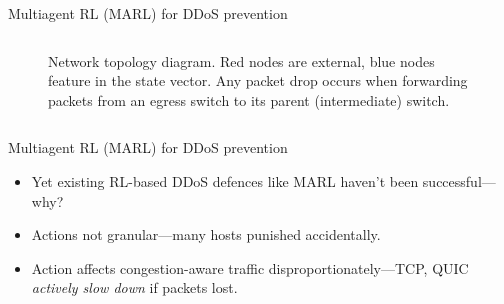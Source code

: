 \documentclass[aspectratio=169,xcolor={dvipsnames}
,hide notes
]{beamer}
\makeatletter
\DeclareRobustCommand{\rvdots}{%
	\vbox{
		\baselineskip4\p@\lineskiplimit\z@
		\kern-\p@
		\hbox{.}\hbox{.}\hbox{.}
}}
\makeatother
\begin{document}
\begin{frame}{Multiagent RL (MARL) for DDoS prevention}
\begin{columns}
\begin{column}{0.5\linewidth}
\begin{figure}
{
			}
			\caption{
				Network topology diagram.
				Red nodes are external, blue nodes feature in the state vector.
				Any packet drop occurs when forwarding packets from an egress switch to its parent (intermediate) switch.
			}
		\end{figure}
	\end{column}
\end{columns}
\end{frame}

\begin{frame}{Multiagent RL (MARL) for DDoS prevention}
%	
%	
%

\begin{itemize}
	\item Yet existing RL-based DDoS defences like MARL haven't been successful---why?
	
	\item \alert{Actions not granular}---many hosts punished accidentally.
	\item \alert{Action affects congestion-aware traffic disproportionately}---TCP, QUIC \emph{actively slow down} if packets lost.
\end{itemize}
\end{frame}
\end{document}
